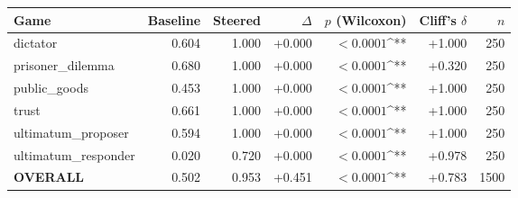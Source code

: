 \begin{tabular}{lrrrrrr}
\toprule
Game & Baseline & Steered & $\Delta$ & $p$ (Wilcoxon) & Cliff's $\delta$ & $n$ \\
\midrule
dictator & 0.604 & 1.000 & +0.000 & $<0.0001$^{**} & +1.000 & 250 \\
prisoner_dilemma & 0.680 & 1.000 & +0.000 & $<0.0001$^{**} & +0.320 & 250 \\
public_goods & 0.453 & 1.000 & +0.000 & $<0.0001$^{**} & +1.000 & 250 \\
trust & 0.661 & 1.000 & +0.000 & $<0.0001$^{**} & +1.000 & 250 \\
ultimatum_proposer & 0.594 & 1.000 & +0.000 & $<0.0001$^{**} & +1.000 & 250 \\
ultimatum_responder & 0.020 & 0.720 & +0.000 & $<0.0001$^{**} & +0.978 & 250 \\
\textbf{OVERALL} & 0.502 & 0.953 & +0.451 & $<0.0001$^{**} & +0.783 & 1500 \\
\bottomrule
\end{tabular}
